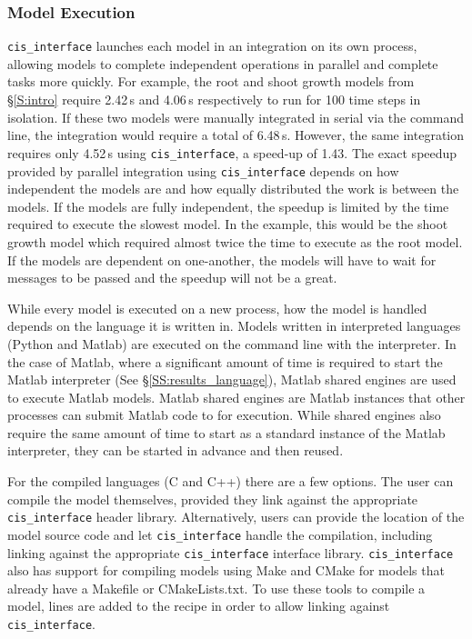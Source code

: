 \documentclass[journal]{IEEEtran}
\newcommand{\cis}{{\tt cis\_interface}{}}
\begin{document}
\subsubsection{Model Execution}\label{SS:model_execution}
%
{\cis} launches each model in an integration on its own process, allowing models to complete independent operations in parallel and complete tasks more quickly. For example, the root and shoot growth models from \S\ref{S:intro} require 2.42\,s and 4.06\,s respectively to run for 100 time steps in isolation. If these two models were manually integrated in serial via the command line, the integration would require a total of 6.48\,s. However, the same integration requires only 4.52\,s using {\cis}, a speed-up of 1.43. The exact speedup provided by parallel integration using {\cis} depends on how independent the models are and how equally distributed the work is between the models. If the models are fully independent, the speedup is limited by the time required to execute the slowest model. In the example, this would be the shoot growth model which required almost twice the time to execute as the root model. If the models are dependent on one-another, the models will have to wait for messages to be passed and the speedup will not be a great.

While every model is executed on a new process, how the model is handled depends 
on the language it is written in. Models written in 
interpreted languages (Python and Matlab) are executed on the command line 
with the interpreter. In the case of Matlab, where a significant amount of time is required to start 
the Matlab interpreter (See \S\ref{SS:results_language}), Matlab shared engines are used 
to execute Matlab models. Matlab shared engines are Matlab instances that other processes can 
submit Matlab code to for execution. While shared engines also require the same amount of time 
to start as a standard instance of the Matlab interpreter, they can be started in advance and then 
reused.

For the compiled languages (C and C++) there are a few options. The user can 
compile the model themselves, provided they link against the appropriate 
{\cis} header library. Alternatively, users can provide the location of 
the model source code and let {\cis} handle the compilation, including 
linking against the appropriate {\cis} interface library. {\cis} 
also has support for compiling models using Make \citep{Stallman2004} and 
CMake \citep{Martin2006} for 
models that already have a Makefile or CMakeLists.txt. To use these tools to compile a model, 
lines are added to the recipe in order to allow linking against {\cis}.
\end{document}

